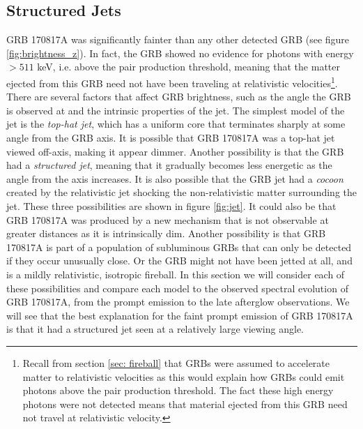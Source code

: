 \documentclass[11pt]{cuthesis}
\begin{document}
\subsection{Structured Jets} \label{sec:structured jets}
GRB 170817A was significantly fainter than any other detected GRB (see figure \ref{fig:brightness_z}). In fact, the GRB showed no evidence for photons with energy $>511$ keV, i.e. above the pair production threshold, meaning that the matter ejected from this GRB need not have been traveling at relativistic velocities\footnote{Recall from section \ref{sec: fireball} that GRBs were assumed to accelerate matter to relativistic velocities as this would explain how GRBs could emit photons above the pair production threshold. The fact these high energy photons were not detected means that material ejected from this GRB need not travel at relativistic velocity.}. There are several factors that affect GRB brightness, such as the angle the GRB is observed at and the intrinsic properties of the jet. The simplest model of the jet is the \textit{top-hat jet}, which has a uniform core that terminates sharply at some angle from the GRB axis. It is possible that GRB 170817A was a top-hat jet viewed off-axis, making it appear dimmer. Another possibility is that the GRB had a \textit{structured jet}, meaning that it gradually becomes less energetic as the angle from the axis increases. It is also possible that the GRB jet had a \textit{cocoon} created by the relativistic jet shocking the non-relativistic matter surrounding the jet. These three possibilities are shown in figure \ref{fig:jet}. It could also be that GRB 170817A was produced by a new mechanism that is not observable at greater distances as it is intrinsically dim. Another possibility is that GRB 170817A is part of a population of subluminous GRBs that can only be detected if they occur unusually close. Or the GRB might not have been jetted at all, and is a mildly relativistic, isotropic fireball. In this section we will consider each of these possibilities and compare each model to the observed spectral evolution of GRB 170817A, from the prompt emission to the late afterglow observations. We will see that the best explanation for the faint prompt emission of GRB 170817A is that it had a structured jet seen at a relatively large viewing angle. 
\end{document}
